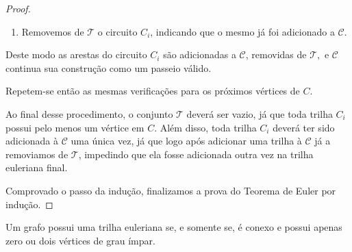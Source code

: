 \begin{proof}
\begin{tcolorbox}
\begin{enumerate}
        \item Removemos de $\mathcal{T}$ o circuito $C_i$, indicando que o mesmo já foi adicionado a $\mathcal{C}$.

\end{enumerate}

Deste modo as arestas do circuito $C_i$ são adicionadas a $\mathcal{C}$, removidas de $\mathcal{T},$ e $\mathcal{C}$ continua sua construção como um passeio válido.

Repetem-se então as mesmas verificações para os próximos vértices de $C$.

\end{tcolorbox}


Ao final desse procedimento, o conjunto $\mathcal{T}$ deverá ser vazio, já que toda trilha $C_i$ possui pelo menos um vértice em $C$. Além disso, toda trilha $C_i$ deverá ter sido adicionada à $\mathcal{C}$ uma única vez, já que logo após adicionar uma trilha à $\mathcal{C}$ já a removiamos de $\mathcal{T}$, impedindo que ela fosse adicionada outra vez na trilha euleriana final.

Comprovado o passo da indução, finalizamos a prova do Teorema de Euler por indução.

\end{proof}

\begin{corollary}
    Um grafo possui uma trilha euleriana se, e somente se, é conexo e possui apenas zero ou dois vértices de grau ímpar.
\end{corollary}

